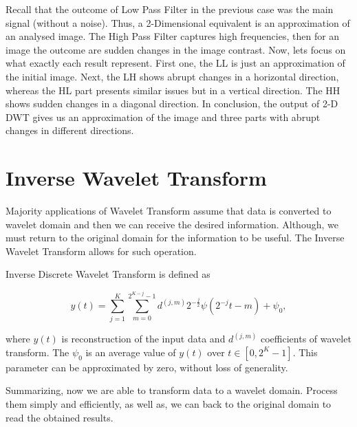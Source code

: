 Recall that the outcome of Low Pass Filter in the previous case was the main signal (without a noise). Thus, a 2-Dimensional equivalent is an approximation of an analysed image. The High Pass Filter captures high frequencies, then for an image the outcome are sudden changes in the image contrast. Now, lets focus on what exactly each result represent. First one, the LL is just an approximation of the initial image. Next, the LH shows abrupt changes in a horizontal direction, whereas the HL part presents similar issues but in a vertical direction. The HH shows sudden changes in a diagonal direction. In conclusion, the output of 2-D DWT gives us an approximation of the image and three parts with abrupt changes in different directions.

\section{Inverse Wavelet Transform}

Majority applications of Wavelet Transform assume that data is converted to wavelet domain and then we can receive the desired information. Although, we must return to the original domain for the information to be useful. The Inverse Wavelet Transform allows for such operation.

\begin{defn}
Inverse Discrete Wavelet Transform is defined as

\begin{equation}
y(t) = \sum_{j=1}^{K} \sum_{m=0}^{2^{K-j}-1} d^{(j,m)} 2^{-\frac{j}{2}} \psi\left(2^{-j}t - m\right) + \psi_0,
\end{equation}

where $y(t)$ is reconstruction of the input data and $d^{(j,m)}$ coefficients of wavelet transform. The $\psi_0$ is an average value of $y(t)$ over $t \in [0, 2^K-1]$. This parameter can be approximated by zero, without loss of generality.
\end{defn}

Summarizing, now we are able to transform data to a wavelet domain. Process them simply and efficiently, as well as, we can back to the original domain to read the obtained results.
